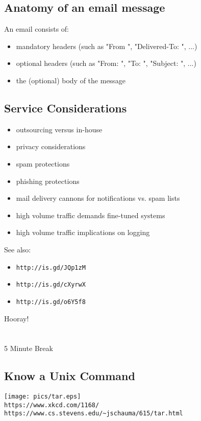 \documentclass[xga]{xdvislides}
\begin{document}
\subsection{Anatomy of an email message}
An email consists of:
\begin{itemize}
	\item mandatory headers (such as "From ", "Delivered-To: ", ...)
	\item optional headers (such as "From: ", "To: ", "Subject: ", ...)
	\item the (optional) body of the message
\end{itemize}

\subsection{Service Considerations}
\begin{itemize}
	\item outsourcing versus in-house
	\item privacy considerations
	\item spam protections
	\item phishing protections
	\item mail delivery cannons for notifications vs. spam lists
	\item high volume traffic demands fine-tuned systems
	\item high volume traffic implications on logging
\end{itemize}
\vspace{.5in}
See also:
\begin{itemize}
	\item {\tt http://is.gd/JQp1zM}
	\item {\tt http://is.gd/cXyrwX}
	\item {\tt http://is.gd/o6Y5f8}
\end{itemize}

\newpage
\vspace*{\fill}
\begin{center}
    \Hugesize
        Hooray! \\ [1em]
    \hspace*{5mm}
    \blueline\\
    \hspace*{5mm}\\
        5 Minute Break
\end{center}
\vspace*{\fill}

\subsection{Know a Unix Command}
\vspace*{\fill}
\begin{center}
	\texttt{[image: pics/tar.eps]} \\
	\verb+https://www.xkcd.com/1168/+ \\
	\verb+https://www.cs.stevens.edu/~jschauma/615/tar.html+
\end{center}
\vspace*{\fill}
\end{document}
